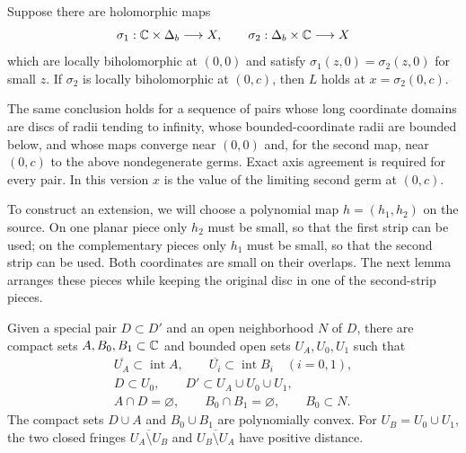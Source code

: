 \begin{samepage}
\begin{proposition}\label{loc:criterion}
Suppose there are holomorphic maps
\[
\sigma_1:\mathbb C\times\Delta_b\longrightarrow X,\qquad
\sigma_2:\Delta_b\times\mathbb C\longrightarrow X
\]
which are locally biholomorphic at $(0,0)$ and satisfy
$\sigma_1(z,0)=\sigma_2(z,0)$ for small $z$. If $\sigma_2$ is
locally biholomorphic at $(0,c)$, then $L$ holds at
$x=\sigma_2(0,c)$.

The same conclusion holds for a sequence of pairs whose long
coordinate domains are discs of radii tending to infinity, whose
bounded-coordinate radii are bounded below, and whose maps converge
near $(0,0)$ and, for the second map, near $(0,c)$ to the above
nondegenerate germs. Exact axis agreement is required for every pair.
In this version $x$ is the value of the limiting second germ at $(0,c)$.
\end{proposition}
\end{samepage}

To construct an extension, we will choose a polynomial map
$h=(h_1,h_2)$ on the source. On one planar piece only $h_2$ must
be small, so that the first strip can be used; on the complementary
pieces only $h_1$ must be small, so that the second strip can be
used. Both coordinates are small on their overlaps. The next lemma
arranges these pieces while keeping the original disc in one of
the second-strip pieces.

\begin{lemma}\label{loc:pieces}
Given a special pair $D\subset D'$ and an open neighborhood $N$ of
$D$, there are compact sets $A,B_0,B_1\subset\mathbb C$ and bounded open
sets $U_A,U_0,U_1$ such that
\[
\begin{gathered}
\overline{U_A}\subset\operatorname{int}A,\qquad
\overline{U_i}\subset\operatorname{int}B_i\quad(i=0,1),\\
D\subset U_0,\qquad D'\subset U_A\cup U_0\cup U_1,\\
A\cap D=\varnothing,\qquad B_0\cap B_1=\varnothing,\qquad B_0\subset N.
\end{gathered}
\]
The compact sets $D\cup A$ and $B_0\cup B_1$ are polynomially convex.
For $U_B=U_0\cup U_1$, the two closed fringes
$\overline{U_A\setminus U_B}$ and $\overline{U_B\setminus U_A}$
have positive distance.
\end{lemma}

